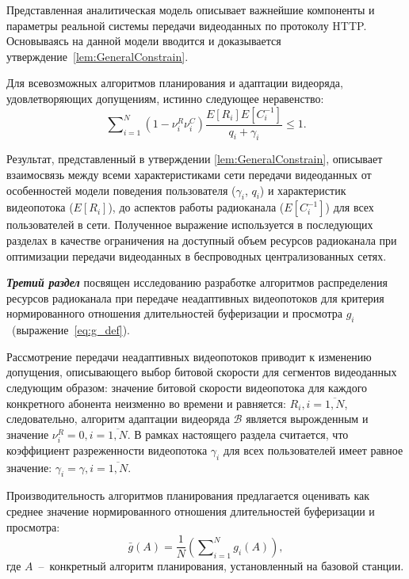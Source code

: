 Представленная аналитическая модель описывает важнейшие компоненты и параметры реальной системы передачи видеоданных по протоколу HTTP. Основываясь на данной модели вводится и доказывается утверждение~\ref{lem:GeneralConstrain}.

\begin{lemma}
\label{lem:GeneralConstrain}
Для всевозможных алгоритмов планирования и адаптации видеоряда, удовлетворяющих допущениям, истинно следующее неравенство:
\emph{
\begin{equation}
	\label{eq:GeneralConstrain}
	\nonumber
	\sum\nolimits_{i=1}^{N} {\left(1-\nu^R_i\nu^C_i\right)\frac{E[R_i]E[C_i^{-1}]}{q_i + \gamma_i}} \leq 1.
\end{equation}
}
\end{lemma}

Результат, представленный в утверждении \ref{lem:GeneralConstrain}, описывает взаимосвязь между всеми характеристиками сети передачи видеоданных от особенностей модели поведения пользователя ($\gamma_i$, $q_i$) и характеристик видеопотока ($E[R_i]$), до аспектов работы радиоканала ($E[C_i^{-1}]$) для всех пользователей в сети. Полученное выражение используется в последующих разделах в качестве ограничения на доступный объем ресурсов радиоканала при оптимизации передачи видеоданных в беспроводных централизованных сетях.

\textbf{\textit{Третий раздел}} посвящен исследованию разработке алгоритмов распределения ресурсов радиоканала при передаче неадаптивных видеопотоков для критерия нормированного отношения длительностей буферизации и просмотра \mbox{$g_i$ (выражение \ref{eq:g_def})}.

Рассмотрение передачи неадаптивных видеопотоков приводит к изменению допущения, описывающего выбор битовой скорости для сегментов видеоданных следующим образом: значение битовой скорости видеопотока для каждого конкретного абонента неизменно во времени и равняется: $R_i, i=\overline{1,N}$, следовательно, алгоритм адаптации видеоряда $\mathcal{B}$ является вырожденным и значение $\nu^R_i = 0, i = \overline{1,N}$. В рамках настоящего раздела считается, что коэффициент разреженности видеопотока $\gamma_i$ для всех пользователей имеет равное значение: $\gamma_i = \gamma, i=\overline{1,N}$.

Производительность алгоритмов планирования предлагается оценивать как среднее значение нормированного отношения длительностей буферизации и просмотра:
$$\bar{g}\left(A\right) = \frac{1}{N}\left(\sum\nolimits_{i=1}^{N} {g_i\left(A\right)}\right),$$
где $A$~--~конкретный алгоритм планирования, установленный на базовой станции.

